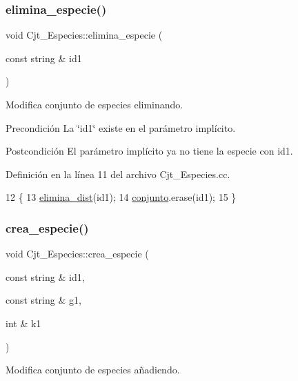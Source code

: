 \subsubsection{\texorpdfstring{elimina\+\_\+especie()}{elimina\_especie()}}
{\footnotesize\ttfamily void Cjt\+\_\+\+Especies\+::elimina\+\_\+especie (\begin{DoxyParamCaption}\item[{const string \&}]{id1 }\end{DoxyParamCaption})}



Modifica conjunto de especies eliminando. 

\begin{DoxyPrecond}{Precondición}
La \char`\"{}id1\char`\"{} existe en el parámetro implícito. 
\end{DoxyPrecond}
\begin{DoxyPostcond}{Postcondición}
El parámetro implícito ya no tiene la especie con id1. 
\end{DoxyPostcond}


Definición en la línea 11 del archivo Cjt\+\_\+\+Especies.\+cc.


\begin{DoxyCode}
12 \{
13     \hyperlink{class_cjt___especies_aa5a9db993526200a3bf0a640e4ac49bc}{elimina\_dist}(id1);
14     \hyperlink{class_cjt___especies_a82ed53cbd620caca3db6b5c20b37a60a}{conjunto}.erase(id1);
15 \}
\end{DoxyCode}
\mbox{\label{class_cjt___especies_a94019f4a9bb2117abf8d0d1aa507fe2e}} 
\subsubsection{\texorpdfstring{crea\+\_\+especie()}{crea\_especie()}}
{\footnotesize\ttfamily void Cjt\+\_\+\+Especies\+::crea\+\_\+especie (\begin{DoxyParamCaption}\item[{const string \&}]{id1,  }\item[{const string \&}]{g1,  }\item[{int \&}]{k1 }\end{DoxyParamCaption})}



Modifica conjunto de especies añadiendo. 

